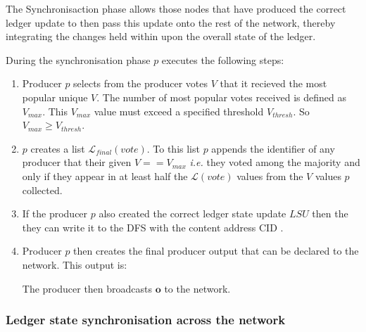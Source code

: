 The Synchronisaction phase allows those nodes that have produced the correct ledger update to then pass this update onto the rest of the network, thereby integrating the changes held within upon the overall state of the ledger. 

During the synchronisation phase $p$ executes the following steps:

\begin{enumerate}

\item Producer $p$ selects from the producer votes $V$ that it recieved the most popular unique $V$. The number of most popular votes received is defined as $V_{max}$. This $V_{max}$ value must exceed a specified threshold $V_{thresh}$. So $V_{max} \geq V_{thresh}$. %

\item $p$ creates a list $\mathcal{L}_{final}(vote)$. To this list $p$ appends the identifier of any producer that their given $V == V_{max}$ \textit{i.e.} they voted among the majority and only if they appear in at least half the $\mathcal{L}(vote)$ values from the $V$ values $p$ collected. 

\item If the producer $p$ also created the correct ledger state update $LSU$ then the they can write it to the DFS with the content address CID \cite{ADD LINK TO CID OBJ}. 

\item Producer $p$ then creates the final producer output that can be declared to the network. This output is:
\begin{center}
\label{eq:Hj}
\end{center}


The producer then broadcasts $\mathbf{o}$ to the network.
\end{enumerate}



\subsubsection{Ledger state synchronisation across the network}

